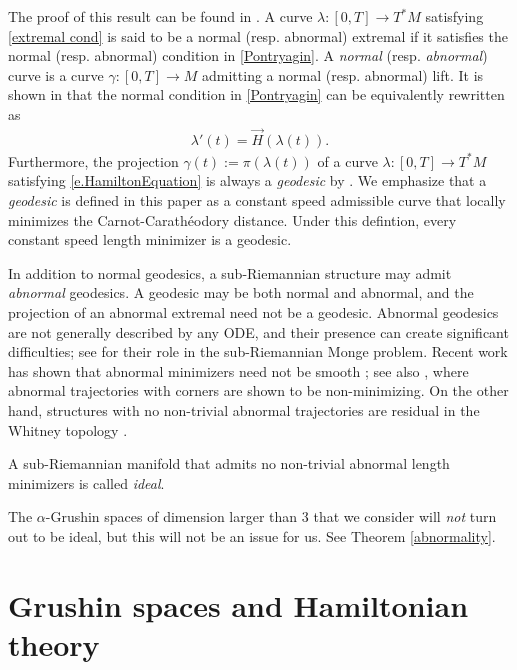 \documentclass[12pt]{amsart}
\numberwithin{equation}{section}
\theoremstyle{plain}
\theoremstyle{definition}
\theoremstyle{remark}
\begin{document}
The proof of this result can be found in \cite[Theorem 4.20]{AgrachevBarilariBoscainBook2020}. A curve $\lambda : [0, T] \to T^*M$ satisfying \eqref{extremal cond} is said to be a normal (resp. abnormal) extremal if it satisfies the normal (resp. abnormal) condition in \eqref{Pontryagin}. A \emph{normal} (resp. \emph{abnormal}) curve is a curve $\gamma : [0, T] \to M$ admitting a normal (resp. abnormal) lift. It is shown in \cite[Proposition 4.22]{AgrachevBarilariBoscainBook2020} that the normal condition in \eqref{Pontryagin} can be equivalently rewritten as
\begin{align}\label{e.HamiltonEquation}
    \lambda'\left( t \right)=\vec{H}\left( \lambda\left( t \right) \right).
\end{align}
Furthermore, the projection $\gamma(t) := \pi(\lambda(t))$ of a curve $\lambda : [0, T] \to T^*M$ satisfying \eqref{e.HamiltonEquation} is always a \textit{geodesic} by \cite[Theorem 4.65]{AgrachevBarilariBoscainBook2020}. We emphasize that a \emph{geodesic} is defined in this paper as a constant speed admissible curve that locally minimizes the Carnot-Carath\'{e}odory distance. Under this defintion, every constant speed length minimizer is a geodesic.

In addition to normal geodesics, a sub-Riemannian structure may admit \emph{abnormal} geodesics.
A geodesic may be both normal and abnormal, and the projection of an abnormal extremal need
not be a geodesic. Abnormal geodesics are not generally described by any ODE, and their presence can create significant
difficulties; see \cite{LudovicSR} for their role in the sub-Riemannian Monge problem.
Recent work has shown that abnormal minimizers need not be smooth
\cite{ChitourJeanMontiRiffordSacchelliSigalottiSocionovo2025}; see also
\cite{Hakavuori_2016}, where abnormal trajectories with corners are shown to be non-minimizing.
On the other hand, structures with no non-trivial abnormal trajectories are residual in the
Whitney topology \cite{ChitourJeanTrelat2006}.

A sub-Riemannian manifold that admits no non-trivial abnormal length minimizers is called \emph{ideal}.

The $\alpha$-Grushin spaces of dimension larger than 3 that we consider will \emph{not} turn out to be ideal, but this will not be an issue for us. See Theorem \ref{abnormality}.

\section{Grushin spaces and Hamiltonian theory} \label{s.GrushinSpaces}
\end{document}
